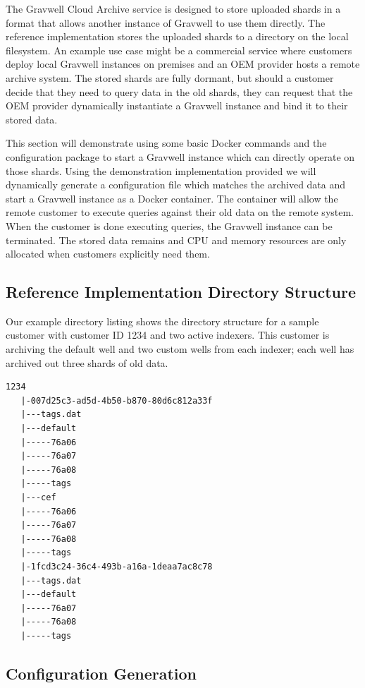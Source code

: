 The Gravwell Cloud Archive service is designed to store uploaded shards
in a format that allows another instance of Gravwell to use them
directly. The reference implementation stores the uploaded shards to a
directory on the local filesystem. An example use case might be a
commercial service where customers deploy local Gravwell instances on
premises and an OEM provider hosts a remote archive system. The stored
shards are fully dormant, but should a customer decide that they need to
query data in the old shards, they can request that the OEM provider
dynamically instantiate a Gravwell instance and bind it to their stored
data. 

This section will demonstrate using some basic Docker commands and the
configuration package to start a Gravwell instance which can directly
operate on those shards. Using the demonstration implementation
provided we will dynamically generate a configuration file which matches
the archived data and start a Gravwell instance as a Docker container.
The container will allow the remote customer to execute queries against
their old data on the remote system. When the customer is done
executing queries, the Gravwell instance can be terminated. The stored
data remains and CPU and memory resources are only allocated when
customers explicitly need them.

\subsection{Reference Implementation Directory Structure}

Our example directory listing shows the directory structure for a
sample customer with customer ID 1234 and two active indexers. This
customer is archiving the default well and two custom wells from each
indexer; each well has archived out three shards of old data.

\begin{Verbatim}[breaklines=true]
1234                  
   |-007d25c3-ad5d-4b50-b870-80d6c812a33f
   |---tags.dat
   |---default
   |-----76a06
   |-----76a07
   |-----76a08
   |-----tags
   |---cef            
   |-----76a06
   |-----76a07        
   |-----76a08
   |-----tags                           
   |-1fcd3c24-36c4-493b-a16a-1deaa7ac8c78
   |---tags.dat
   |---default
   |-----76a07
   |-----76a08
   |-----tags
\end{Verbatim}

\subsection{Configuration Generation}

